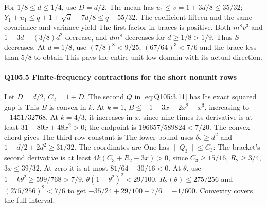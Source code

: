 For $1/8\le\allowbreak  d\le\allowbreak 1/4$, use $D=\allowbreak d/2$.
The mean has $u_1\le\allowbreak  v=\allowbreak 1+3d/8\le\allowbreak 35/32$;
$Y_1+u_1\le\allowbreak  q+1+\sqrt d+7d/8\le\allowbreak  q+55/32$.
The coefficient fifteen and the same covariance and variance yield
The first factor in braces is positive.
Both $m^8v^3$ and $1-3d-(3/8)d^2$ decrease, and $dm^8$ decreases
for $d\ge\allowbreak 1/8>\allowbreak 1/9$. Thus $S$ decreases.
At $d=\allowbreak 1/8$, use $(7/8)^8<\allowbreak 9/25$, $(67/64)^3<\allowbreak 7/6$ and the brace
less than $5/8$ to obtain
This pays the entire unit low domain with its actual direction.

\paragraph{Q105.5 Finite-frequency contractions for the short nonunit rows}\label{part:Q105.5}
Let $D=\allowbreak d/2$, $C_2=\allowbreak 1+D$. The second $Q$ in \eqref{eq:Q105:3.11} has
Its exact squared gap is
This $B$ is convex in $k$.
At $k=\allowbreak 1$, $B\le\allowbreak -1+3x-2x^2+x^3$, increasing to $-1451/32768$.
At $k=\allowbreak 4/3$, it increases in $x$, since nine times its derivative is at
least $31-80x+48x^2>\allowbreak 0$; the endpoint is $196657/589824<\allowbreak 7/20$.
The convex chord gives
The third-row constant is
The lower bound uses $\delta_2\ge\allowbreak  d^2$ and
$1-d/2+2d^2\ge\allowbreak 31/32$. The coordinates are
One has $\|Q_3\|\le\allowbreak  C_3$:
The bracket's second derivative is at least
$4k(C_3+R_2-3x)>\allowbreak 0$, since $C_3\ge\allowbreak 15/16$, $R_2\ge\allowbreak 3/4$, $3x\le\allowbreak 39/32$.
At zero it is at most $81/64-30/16<\allowbreak 0$.
At $\theta$, use $1-k\theta^2\ge\allowbreak 599/768>\allowbreak 7/9$,
$\theta(1-\theta^2)^2<\allowbreak 29/100$, $R_2(\theta)\le\allowbreak 275/256$ and
$(275/256)^2<\allowbreak 7/6$ to get
$-35/24+29/100+7/6=\allowbreak -1/600$.
Convexity covers the full interval.

